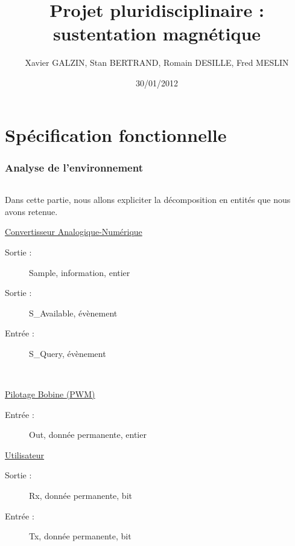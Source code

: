\documentclass[11pt, french]{article} %
\title{Projet pluridisciplinaire : sustentation magnétique}
\author{ Xavier GALZIN, Stan BERTRAND, Romain DESILLE, Fred MESLIN}
\date{30/01/2012}
\begin{document}
\maketitle
\pagebreak


\part{Spécification fonctionnelle}

\section{Analyse de l'environnement}

\paragraph{} Dans cette partie, nous allons expliciter la décomposition en entités que nous avons retenue.
\vspace{0.2in}

\begin{minipage}[t]{9cm}
\hspace{0.2in}
\underline{Convertisseur Analogique-Numérique}
\begin{description}
\item[Sortie :] Sample, information, entier
\item[Sortie :] S\_Available, évènement
\item[Entrée :] S\_Query, évènement
\end{description}


\end{minipage}
~
\begin{minipage}[t]{8cm}
\hspace{0.2in}
\underline{Pilotage Bobine (PWM)}
\begin{description}
\item[Entrée : ] Out, donnée permanente, entier
\end{description}


\end{minipage}

\begin{minipage}[h]{20cm}
\hspace{0.2in}
\hspace{0.2in}
\underline{Utilisateur}   
\begin{description}
\item[Sortie : ] Rx, donnée permanente, bit
\item[Entrée : ] Tx, donnée permanente, bit
\end{description}


\end{minipage}
\end{document}
